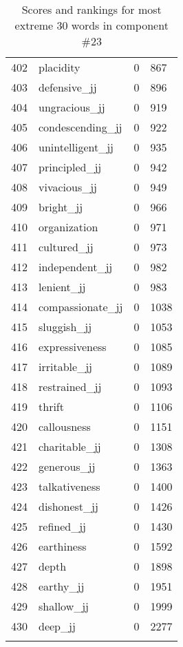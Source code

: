 \begin{longtable}[!htbp]{| rlr@{.}l |}
    402 & placidity & 0 & 867 \\
    403 & defensive\_jj & 0 & 896 \\
    404 & ungracious\_jj & 0 & 919 \\
    405 & condescending\_jj & 0 & 922 \\
    406 & unintelligent\_jj & 0 & 935 \\
    407 & principled\_jj & 0 & 942 \\
    408 & vivacious\_jj & 0 & 949 \\
    409 & bright\_jj & 0 & 966 \\
    410 & organization & 0 & 971 \\
    411 & cultured\_jj & 0 & 973 \\
    412 & independent\_jj & 0 & 982 \\
    413 & lenient\_jj & 0 & 983 \\
    414 & compassionate\_jj & 0 & 1038 \\
    415 & sluggish\_jj & 0 & 1053 \\
    416 & expressiveness & 0 & 1085 \\
    417 & irritable\_jj & 0 & 1089 \\
    418 & restrained\_jj & 0 & 1093 \\
    419 & thrift & 0 & 1106 \\
    420 & callousness & 0 & 1151 \\
    421 & charitable\_jj & 0 & 1308 \\
    422 & generous\_jj & 0 & 1363 \\
    423 & talkativeness & 0 & 1400 \\
    424 & dishonest\_jj & 0 & 1426 \\
    425 & refined\_jj & 0 & 1430 \\
    426 & earthiness & 0 & 1592 \\
    427 & depth & 0 & 1898 \\
    428 & earthy\_jj & 0 & 1951 \\
    429 & shallow\_jj & 0 & 1999 \\
    430 & deep\_jj & 0 & 2277 \\
    \hline
    \caption{Scores and rankings for most extreme 30 words in component \#23} \\
\end{longtable}
